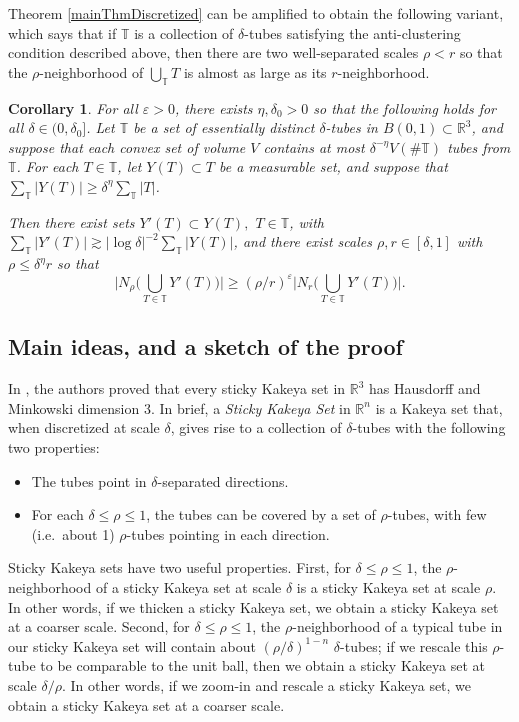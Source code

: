 \documentclass[letterpaper, reqno,11pt]{article}
\numberwithin{equation}{section}
\newcommand{\RR}{\mathbb{R}}
\newcommand{\eps}{\varepsilon}
\newcommand{\tubes}{\mathbb{T}}
\numberwithin{thm}{section}
\newtheorem{cor}[thm]{Corollary}
\theoremstyle{remark}
\begin{document}
Theorem \ref{mainThmDiscretized} can be amplified to obtain the following variant, which says that if $\tubes$ is a collection of $\delta$-tubes satisfying the anti-clustering condition described above, then there are two well-separated scales $\rho < r$ so that the $\rho$-neighborhood of $\bigcup_{\tubes}T$ is almost as large as its $r$-neighborhood. 

\begin{cor}\label{KakeyaTwoScales}
For all $\eps>0$, there exists $\eta,\delta_0>0$ so that the following holds for all $\delta\in(0,\delta_0]$. Let $\tubes$ be a set of essentially distinct $\delta$-tubes in $B(0,1)\subset \RR^3$, and suppose that each convex set of volume $V$ contains at most $\delta^{-\eta}V(\#\tubes)$ tubes from $\tubes$. For each $T\in\tubes$, let $Y(T)\subset T$ be a measurable set, and suppose that $\sum_{\tubes}|Y(T)|\geq\delta^{\eta}\sum_{\tubes}|T|$.  

Then there exist sets $Y'(T)\subset Y(T),$ $T\in\tubes$, with $\sum_\tubes|Y'(T)|\gtrsim|\log\delta|^{-2}\sum_\tubes|Y(T)|$, and there exist scales $\rho,r\in [\delta,1]$ with $\rho\leq\delta^{\eta}r$ so that
\begin{equation}\label{KakeyaSameTwoScalesIneq}
\Big| N_{\rho}\Big(\bigcup_{T\in\tubes}Y'(T)\Big)\Big| \geq (\rho/r)^{\eps} \Big| N_{r}\Big(\bigcup_{T\in\tubes}Y'(T)\Big)\Big|. 
\end{equation}
\end{cor}


\subsection{Main ideas, and a sketch of the proof}\label{proofSketchSection}
In \cite{WZ}, the authors proved that every sticky Kakeya set in $\RR^3$ has Hausdorff and Minkowski dimension 3. In brief, a \emph{Sticky Kakeya Set} in $\RR^n$ is a Kakeya set that, when discretized at scale $\delta$, gives rise to a collection of $\delta$-tubes with the following two properties: 
\begin{itemize}
	\item[(a)] The tubes point in $\delta$-separated directions.
	\item[(b)]For each $\delta\leq \rho\leq 1$, the tubes can be covered by a set of $\rho$-tubes, with few (i.e.~about 1) $\rho$-tubes pointing in each direction.
\end{itemize} 

Sticky Kakeya sets have two useful properties. First, for $\delta\leq\rho\leq 1$, the $\rho$-neighborhood of a sticky Kakeya set at scale $\delta$ is a sticky Kakeya set at scale $\rho$. In other words, if we thicken a sticky Kakeya set, we obtain a sticky Kakeya set at a coarser scale. Second, for $\delta\leq\rho\leq 1$, the $\rho$-neighborhood of a typical tube in our sticky Kakeya set will contain about $(\rho/\delta)^{1-n}$ $\delta$-tubes; if we rescale this $\rho$-tube to be comparable to the unit ball, then we obtain a sticky Kakeya set at scale $\delta/\rho$. In other words, if we zoom-in and rescale a sticky Kakeya set, we obtain a sticky Kakeya set at a coarser scale. 
\end{document}
